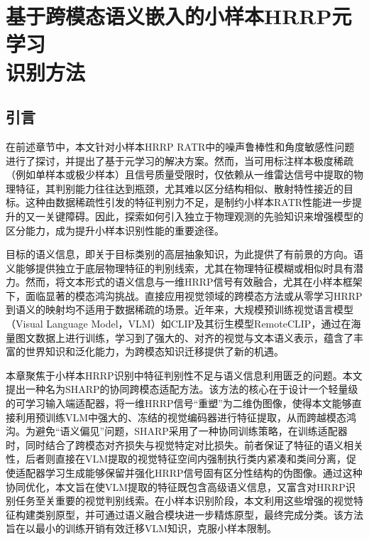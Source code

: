\chapter[基于跨模态语义嵌入的小样本HRRP元学习识别方法]{基于跨模态语义嵌入的小样本HRRP元学习\protect\\ 识别方法}
\label{chap:semantic_fusion}

\section{引言}
\label{sec:semantic_intro}

在前述章节中，本文针对小样本HRRP RATR中的噪声鲁棒性和角度敏感性问题进行了探讨，并提出了基于元学习的解决方案。然而，当可用标注样本极度稀疏（例如单样本或极少样本）且信号质量受限时，仅依赖从一维雷达信号中提取的物理特征，其判别能力往往达到瓶颈，尤其难以区分结构相似、散射特性接近的目标。这种由数据稀疏性引发的特征判别力不足，是制约小样本RATR性能进一步提升的又一关键障碍。因此，探索如何引入独立于物理观测的先验知识来增强模型的区分能力，成为提升小样本识别性能的重要途径。

目标的语义信息，即关于目标类别的高层抽象知识，为此提供了有前景的方向。语义能够提供独立于底层物理特征的判别线索，尤其在物理特征模糊或相似时具有潜力。然而，将文本形式的语义信息与一维HRRP信号有效融合，尤其在小样本框架下，面临显著的模态鸿沟挑战。直接应用视觉领域的跨模态方法或从零学习HRRP到语义的映射均不适用于数据稀疏的场景。近年来，大规模预训练视觉语言模型（Visual Language Model，VLM）如CLIP及其衍生模型RemoteCLIP，通过在海量图文数据上进行训练，学习到了强大的、对齐的视觉与文本语义表示，蕴含了丰富的世界知识和泛化能力，为跨模态知识迁移提供了新的机遇。

本章聚焦于小样本HRRP识别中特征判别性不足与语义信息利用匮乏的问题。本文提出一种名为SHARP的协同跨模态适配方法。该方法的核心在于设计一个轻量级的可学习输入端适配器，将一维HRRP信号“重塑”为二维伪图像，使得本文能够直接利用预训练VLM中强大的、冻结的视觉编码器进行特征提取，从而跨越模态鸿沟。为避免“语义偏见”问题，SHARP采用了一种协同训练策略，在训练适配器时，同时结合了跨模态对齐损失与视觉特定对比损失。前者保证了特征的语义相关性，后者则直接在VLM提取的视觉特征空间内强制执行类内紧凑和类间分离，促使适配器学习生成能够保留并强化HRRP信号固有区分性结构的伪图像。通过这种协同优化，本文旨在使VLM提取的特征既包含高级语义信息，又富含对HRRP识别任务至关重要的视觉判别线索。在小样本识别阶段，本文利用这些增强的视觉特征构建类别原型，并可通过语义融合模块进一步精炼原型，最终完成分类。该方法旨在以最小的训练开销有效迁移VLM知识，克服小样本限制。

